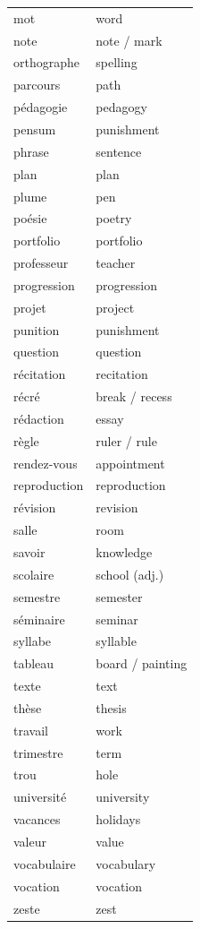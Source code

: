 \documentclass[12pt,a4paper]{article}
\begin{document}
\begin{longtable}{p{4cm} p{6cm}}
mot & word \\
note & note / mark \\
orthographe & spelling \\
parcours & path \\
pédagogie & pedagogy \\
pensum & punishment \\
phrase & sentence \\
plan & plan \\
plume & pen \\
poésie & poetry \\
portfolio & portfolio \\
professeur & teacher \\
progression & progression \\
projet & project \\
punition & punishment \\
question & question \\
récitation & recitation \\
récré & break / recess \\
rédaction & essay \\
règle & ruler / rule \\
rendez-vous & appointment \\
reproduction & reproduction \\
révision & revision \\
salle & room \\
savoir & knowledge \\
scolaire & school (adj.) \\
semestre & semester \\
séminaire & seminar \\
syllabe & syllable \\
tableau & board / painting \\
texte & text \\
thèse & thesis \\
travail & work \\
trimestre & term \\
trou & hole \\
université & university \\
vacances & holidays \\
valeur & value \\
vocabulaire & vocabulary \\
vocation & vocation \\
zeste & zest \\
\bottomrule
\end{longtable}
\end{document}
